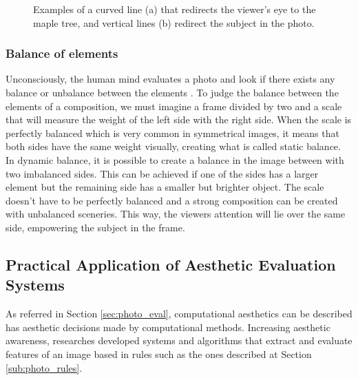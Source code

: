 
\begin{figure}[htbp]
        \centering
  \caption{Examples of a curved line (a) that redirects the viewer's eye to the maple tree, and vertical lines (b) redirect the subject in the photo.}
  \label{fig:leading_lines_image}
\end{figure}

\subsubsection{Balance of elements}
\label{subsub:balance_elements}

Unconsciously, the human mind evaluates a photo and look if there exists any balance or unbalance between the elements \cite{Santos}.
To judge the balance between the elements of a composition, we must imagine a frame divided by two and a scale that will measure the weight of the left side with the right side.
When the scale is perfectly balanced which is very common in symmetrical images, it means that both sides have the same weight visually, creating what is called static balance.
In dynamic balance, it is possible to create a balance in the image between with two imbalanced sides. This can be achieved if one of the sides has a larger element but the remaining side has a smaller but brighter object.
The scale doesn't have to be perfectly balanced and a strong composition can be created with unbalanced sceneries. This way, the viewers attention will lie over the same side, empowering the subject in the frame.



\subsection{Practical Application of Aesthetic Evaluation Systems}
\label{subsub:eval_applications}


As referred in Section \ref{sec:photo_eval}, computational aesthetics can be described has aesthetic decisions made by computational methods. Increasing aesthetic awareness, researches developed systems and algorithms that extract and evaluate features of an image based in rules such as the ones described at Section \ref{sub:photo_rules}.

